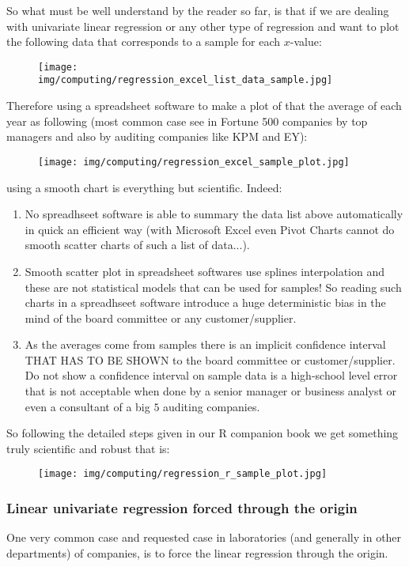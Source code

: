 	So what must be well understand by the reader so far, is that if we are dealing with univariate linear regression or any other type of regression and want to plot the following data that corresponds to a sample for each $x$-value:
	\begin{figure}[H]
		\centering
		\texttt{[image: img/computing/regression\_excel\_list\_data\_sample.jpg]}
	\end{figure}
	Therefore using a spreadsheet software to make a plot of that the average of each year as following (most common case see in Fortune 500 companies by top managers and also by auditing companies like KPM and EY):
	\begin{figure}[H]
		\centering
		\texttt{[image: img/computing/regression\_excel\_sample\_plot.jpg]}
	\end{figure}
	using a smooth chart is everything but scientific. Indeed:
	\begin{enumerate}
		\item No spreadhseet software is able to summary the data list above automatically in quick an efficient way (with Microsoft Excel even Pivot Charts cannot do smooth scatter charts of such a list of data...).
		
		\item Smooth scatter plot in spreadsheet softwares use splines interpolation and these are not statistical models that can be used for samples! So reading such charts in a spreadhseet software introduce a huge deterministic bias in the mind of the board committee or any customer/supplier.
		
		\item As the averages come from samples there is an implicit confidence interval THAT HAS TO BE SHOWN to the board committee or customer/supplier. Do not show a confidence interval on sample data is a high-school level error that is not acceptable when done by a senior manager or business analyst or even a consultant of a big $5$ auditing companies.
	\end{enumerate}
	So following the detailed steps given in our R companion book we get something truly scientific and robust that is:
	\begin{figure}[H]
		\centering
		\texttt{[image: img/computing/regression\_r\_sample\_plot.jpg]}
	\end{figure}
	
	\pagebreak
	\subsubsection{Linear univariate regression forced through the origin}
	One very common case and requested case in laboratories (and generally in other departments) of companies, is to force the linear regression through the origin.
	
